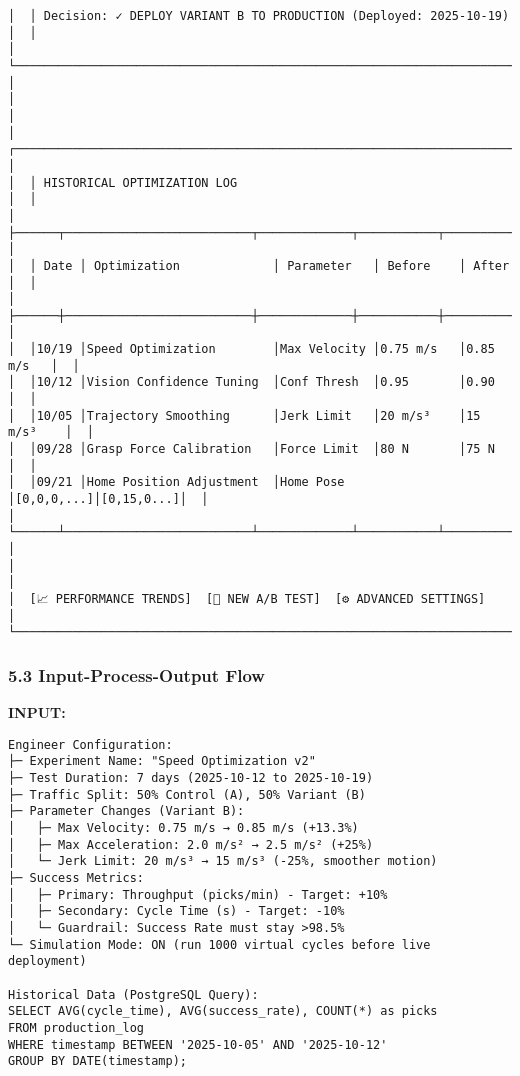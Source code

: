 \documentclass[
]{article}
\begin{document}
\begin{verbatim}
│  │ Decision: ✓ DEPLOY VARIANT B TO PRODUCTION (Deployed: 2025-10-19)      │  │
│  └─────────────────────────────────────────────────────────────────────────┘  │
│                                                                                │
│  ┌─────────────────────────────────────────────────────────────────────────┐  │
│  │ HISTORICAL OPTIMIZATION LOG                                             │  │
│  ├──────┬──────────────────────────┬─────────────┬───────────┬───────────┤  │
│  │ Date │ Optimization             │ Parameter   │ Before    │ After     │  │
│  ├──────┼──────────────────────────┼─────────────┼───────────┼───────────┤  │
│  │10/19 │Speed Optimization        │Max Velocity │0.75 m/s   │0.85 m/s   │  │
│  │10/12 │Vision Confidence Tuning  │Conf Thresh  │0.95       │0.90       │  │
│  │10/05 │Trajectory Smoothing      │Jerk Limit   │20 m/s³    │15 m/s³    │  │
│  │09/28 │Grasp Force Calibration   │Force Limit  │80 N       │75 N       │  │
│  │09/21 │Home Position Adjustment  │Home Pose    │[0,0,0,...]│[0,15,0...]│  │
│  └──────┴──────────────────────────┴─────────────┴───────────┴───────────┘  │
│                                                                                │
│  [📈 PERFORMANCE TRENDS]  [🔬 NEW A/B TEST]  [⚙️ ADVANCED SETTINGS]          │
└────────────────────────────────────────────────────────────────────────────────┘
\end{verbatim}

\hypertarget{input-process-output-flow-2}{%
\subsubsection{5.3 Input-Process-Output
Flow}\label{input-process-output-flow-2}}

\textbf{INPUT:}

\begin{verbatim}
Engineer Configuration:
├─ Experiment Name: "Speed Optimization v2"
├─ Test Duration: 7 days (2025-10-12 to 2025-10-19)
├─ Traffic Split: 50% Control (A), 50% Variant (B)
├─ Parameter Changes (Variant B):
│   ├─ Max Velocity: 0.75 m/s → 0.85 m/s (+13.3%)
│   ├─ Max Acceleration: 2.0 m/s² → 2.5 m/s² (+25%)
│   └─ Jerk Limit: 20 m/s³ → 15 m/s³ (-25%, smoother motion)
├─ Success Metrics:
│   ├─ Primary: Throughput (picks/min) - Target: +10%
│   ├─ Secondary: Cycle Time (s) - Target: -10%
│   └─ Guardrail: Success Rate must stay >98.5%
└─ Simulation Mode: ON (run 1000 virtual cycles before live deployment)

Historical Data (PostgreSQL Query):
SELECT AVG(cycle_time), AVG(success_rate), COUNT(*) as picks
FROM production_log
WHERE timestamp BETWEEN '2025-10-05' AND '2025-10-12'
GROUP BY DATE(timestamp);
\end{verbatim}
\end{document}
